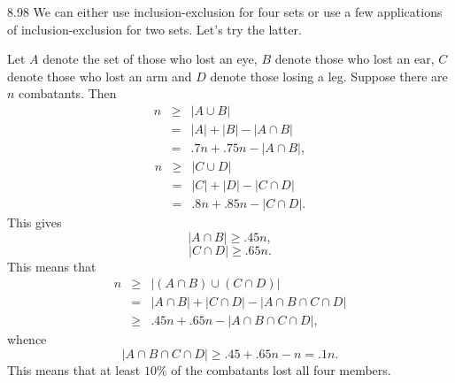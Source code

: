 \begin{Answer}{8.98}
We can either use inclusion-exclusion for four sets or use a few applications
of inclusion-exclusion for two sets.  Let's try the latter.

Let $A$ denote the set of
those who lost an eye, $B$ denote those who lost an ear, $C$ denote
those who lost an arm and $D$ denote those losing a leg. Suppose
there are $n$ combatants.
 Then
$$\begin{array}{lll}
n & \geq & | A \cup B| \\ & = &  | A| + | B| - | A \cap B| \\ & = & .7n + .75n - | A\cap B|,
\end{array}$$
$$\begin{array}{lll}
n  &\geq & | C \cup D| \\ & = & | C| + | D| - | C \cap D| \\ & = & .8n + .85n - |C\cap D|.
\end{array}$$
This gives
$$| A \cap B| \geq .45n,$$
$$| C \cap D| \geq .65n.$$This means that
$$\begin{array}{lll}n &\geq & | (A\cap B) \cup (C \cap D)| \\ & = & | A \cap B| + | C \cap D| - | A \cap B \cap C \cap D|\\
& \geq &  .45n + .65n - | A \cap B \cap C \cap D|,\end{array}$$
whence
$$| A \cap B \cap C \cap D| \geq .45 + .65n - n = .1n.$$This means
that at least $10\%$ of the combatants lost all four members.
\end{Answer}
